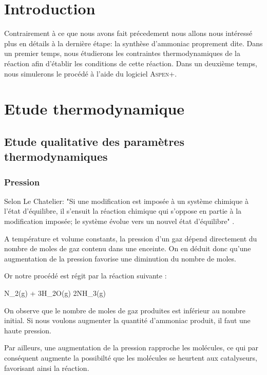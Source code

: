 

\section{Introduction}
Contrairement à ce que nous avons fait précedement nous allons nous intéressé
plus en détails à la dernière étape: la synthèse d'ammoniac proprement dite.
Dans un premier temps, nous étudierons les contraintes thermodynamiques de 
la réaction afin d'établir les conditions de cette réaction.
Dans un deuxième temps, nous simulerons le procédé à l'aide du logiciel
\textsc{Aspen+}.

\section{Etude thermodynamique}
\subsection{Etude qualitative des paramètres thermodynamiques }
\subsubsection{Pression}
Selon Le Chatelier: "Si une modification est imposée à un système chimique à 
l'état d'équilibre, il s'ensuit la réaction chimique qui s'oppose en partie
à la modification imposée; le système évolue vers un nouvel état d'équilibre"
\cite{LeChatelier}.

A température et volume constants, la pression d'un gaz dépend directement
du nombre de moles de gaz contenu dans une enceinte. On en déduit donc qu'une
augmentation de la pression favorise une diminution du nombre de moles.

Or notre procédé est régit par la réaction suivante :
\begin{chemmath} 
	N_2(g) + 3H_{2}O(g) \longrightarrow 2NH_3(g)
\end{chemmath} 

On observe que le nombre de moles de gaz produites est inférieur au nombre 
initial. Si nous voulons augmenter la quantité d'ammoniac produit, il faut 
une haute pression. 

Par ailleurs, une augmentation de la pression rapproche les molécules, ce qui
par conséquent augmente la possibilté que les molécules se heurtent aux 
catalyseurs, favorisant ainsi la réaction.

